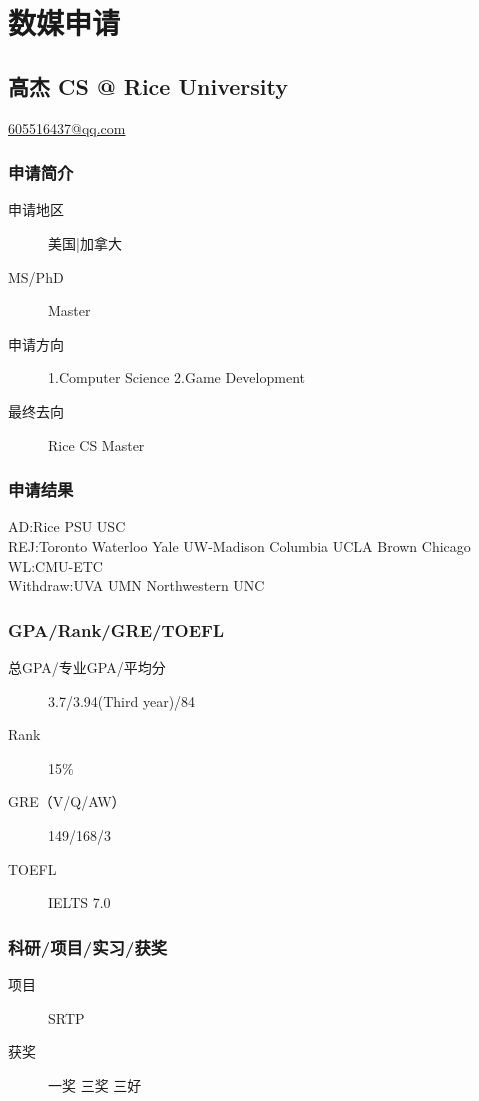 \documentclass[11pt,fleqn,openany]{book} %
\begin{document}
\chapter{数媒申请}
\section{高杰 CS @ Rice University}
\hfill \href{mailto:605516437@qq.com}{605516437@qq.com}

\noindent\begin{minipage}[t]{0.45\textwidth}
\subsection*{申请简介}
\begin{description}
\item[申请地区] 美国|加拿大
\item[MS/PhD] Master
\item[申请方向] 1.Computer Science  2.Game Development
\item[最终去向] Rice CS Master
\end{description}
\end{minipage}
\hfill
\begin{minipage}[t]{0.45\textwidth}
\subsection*{申请结果}
\noindent AD:Rice PSU USC\\
REJ:Toronto Waterloo Yale UW-Madison Columbia UCLA Brown Chicago \\
WL:CMU-ETC\\
Withdraw:UVA UMN Northwestern UNC
\end{minipage}
\subsection*{GPA/Rank/GRE/TOEFL}
\begin{description}
\item[总GPA/专业GPA/平均分] 3.7/3.94(Third year)/84
\item[Rank] 15\%
\item[GRE（V/Q/AW）] 149/168/3
\item[TOEFL] IELTS 7.0
\end{description}

\subsection*{科研/项目/实习/获奖}
\begin{description}
\item[项目] SRTP
\item[获奖] 一奖 三奖 三好
\end{description}
\end{document}
